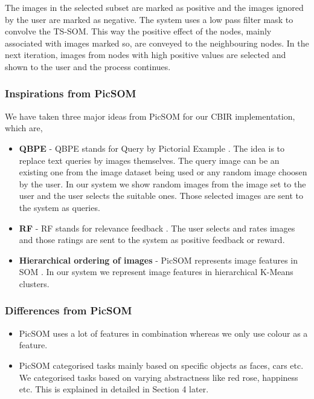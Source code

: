 \documentclass[english]{tktltiki}
\begin{document}
The images in the selected subset are marked as positive and the images ignored by the user are marked as negative. The system uses a low pass filter mask to convolve the TS-SOM. This way the positive effect of the nodes, mainly associated with images marked so, are conveyed to the neighbouring nodes. In the next iteration, images from nodes with high positive values are selected and shown to the user and the process continues.

\subsubsection{Inspirations from PicSOM}

We have taken three major ideas from PicSOM for our CBIR implementation, which are,

\begin{itemize}
	\item \textbf{QBPE} - QBPE stands for Query by Pictorial Example \cite{qbpe}. The idea is to replace text queries by images themselves. The query image can be an existing one from the image dataset being used or any random image choosen by the user. In our system we show random images from the image set to the user and the user selects the suitable ones. Those selected images are sent to the system as queries.
	\item \textbf{RF} - RF stands for relevance feedback \cite{rel_feed}. The user selects and rates images and those ratings are sent to the system as positive feedback or reward.
	\item \textbf{Hierarchical ordering of images} - PicSOM represents image features in SOM \cite{SOM}. In our system we represent image features in hierarchical K-Means \cite{k_means} clusters.
\end{itemize}

\subsubsection{Differences from PicSOM}

\begin{itemize}
	\item PicSOM uses a lot of features in combination whereas we only use colour as a feature.
	\item PicSOM categorised tasks mainly based on specific objects as faces, cars etc. We categorised tasks based on varying abstractness like red rose, happiness etc. This is explained in detailed in Section 4 later.
\end{itemize}
\end{document}
